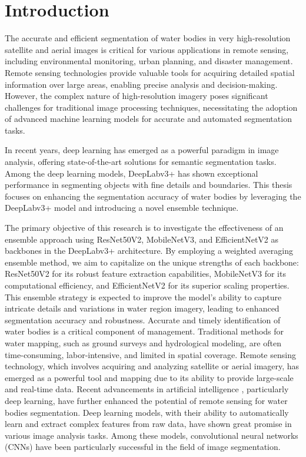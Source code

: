 \section{Introduction}
\label{intro}
The accurate and efficient segmentation of water bodies in very high-resolution satellite and aerial images is critical for various applications in remote sensing, including environmental monitoring, urban planning, and disaster management.\cite{intro1} Remote sensing technologies provide valuable tools for acquiring detailed spatial information over large areas, enabling precise analysis and decision-making. However, the complex nature of high-resolution imagery poses significant challenges for traditional image processing techniques, necessitating the adoption of advanced machine learning models for accurate and automated segmentation tasks.\cite{intro2}\cite{res1}

In recent years, deep learning has emerged as a powerful paradigm in image analysis, offering state-of-the-art solutions for semantic segmentation tasks\cite{res2}. Among the deep learning models, DeepLabv3+ has shown exceptional performance in segmenting objects with fine details and boundaries. This thesis focuses on enhancing the segmentation accuracy of water bodies by leveraging the DeepLabv3+ model and introducing a novel ensemble technique.

The primary objective of this research is to investigate the effectiveness of an ensemble approach using ResNet50V2, MobileNetV3, and EfficientNetV2 as backbones in the DeepLabv3+ architecture. By employing a weighted averaging ensemble method, we aim to capitalize on the unique strengths of each backbone: ResNet50V2 for its robust feature extraction capabilities, MobileNetV3 for its computational efficiency, and EfficientNetV2 for its superior scaling properties. This ensemble strategy is expected to improve the model's ability to capture intricate details and variations in water region imagery, leading to enhanced segmentation accuracy and robustness.
Accurate and timely identification of water bodies is a critical component of management. Traditional methods for water mapping, such as ground surveys and hydrological modeling, are often time-consuming, labor-intensive, and limited in spatial coverage\cite{res3}. Remote sensing technology, which involves acquiring and analyzing satellite or aerial imagery, has emerged as a powerful tool and mapping due to its ability to provide large-scale and real-time data\cite{res4}.
Recent advancements in artificial intelligence \cite{intro3}, particularly deep learning, have further enhanced the potential of remote sensing for water bodies segmentation. Deep learning models, with their ability to automatically learn and extract complex features from raw data, have shown great promise in various image analysis tasks. Among these models, convolutional neural networks (CNNs) have been particularly successful in the field of image segmentation.

